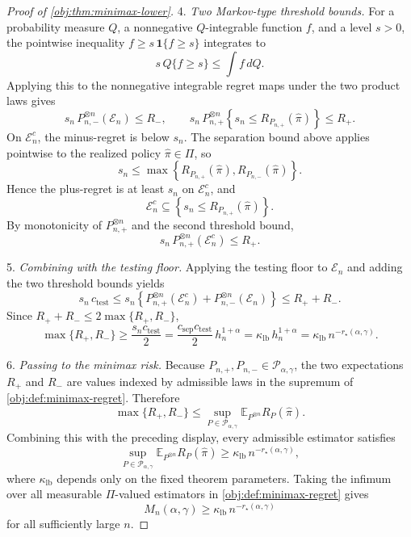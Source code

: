 \documentclass[11pt]{article}
\begin{document}
\begin{proof}[Proof of \cref{obj:thm:minimax-lower}]
4. \emph{Two Markov-type threshold bounds.}  For a probability measure \(Q\), a nonnegative \(Q\)-integrable function \(f\), and a level \(s>0\), the pointwise inequality \(f\ge s\,\mathbf 1\{f\ge s\}\) integrates to
\[
s\,Q\{f\ge s\}\le\int f\,dQ .
\]
Applying this to the nonnegative integrable regret maps under the two product laws gives
\[
s_n\,P_{n,-}^{\otimes n}(\mathcal E_n)\le R_-,
\qquad
s_n\,P_{n,+}^{\otimes n}\left\{s_n\le R_{P_{n,+}}(\widehat\pi)\right\}\le R_+ .
\]
On \(\mathcal E_n^c\), the minus-regret is below \(s_n\).  The separation bound above applies pointwise to the realized policy \(\widehat\pi\in\Pi\), so
\[
s_n\le
\max\left\{R_{P_{n,+}}(\widehat\pi),R_{P_{n,-}}(\widehat\pi)\right\}.
\]
Hence the plus-regret is at least \(s_n\) on \(\mathcal E_n^c\), and
\[
\mathcal E_n^c\subseteq \left\{s_n\le R_{P_{n,+}}(\widehat\pi)\right\}.
\]
By monotonicity of \(P_{n,+}^{\otimes n}\) and the second threshold bound,
\[
s_n\,P_{n,+}^{\otimes n}(\mathcal E_n^c)\le R_+ .
\]

5. \emph{Combining with the testing floor.}  Applying the testing floor to \(\mathcal E_n\) and adding the two threshold bounds yields
\[
s_n\,c_{\mathrm{test}}
\le
s_n\left\{P_{n,+}^{\otimes n}(\mathcal E_n^c)+P_{n,-}^{\otimes n}(\mathcal E_n)\right\}
\le
R_+ + R_- .
\]
Since \(R_++R_-\le 2\max\{R_+,R_-\}\),
\[
\max\{R_+,R_-\}
\ge
\frac{s_n c_{\mathrm{test}}}{2}
=
\frac{c_{\mathrm{sep}}c_{\mathrm{test}}}{2}\,h_n^{1+\alpha}
=
\kappa_{\mathrm{lb}}\,h_n^{1+\alpha}
=
\kappa_{\mathrm{lb}}\,n^{-r_\star(\alpha,\gamma)} .
\]

6. \emph{Passing to the minimax risk.}  Because \(P_{n,+},P_{n,-}\in\mathcal P_{\alpha,\gamma}\), the two expectations \(R_+\) and \(R_-\) are values indexed by admissible laws in the supremum of \cref{obj:def:minimax-regret}.  Therefore
\[
\max\{R_+,R_-\}
\le
\sup_{P\in\mathcal P_{\alpha,\gamma}}
\mathbb E_{P^{\otimes n}} R_P(\widehat\pi).
\]
Combining this with the preceding display, every admissible estimator satisfies
\[
\sup_{P\in\mathcal P_{\alpha,\gamma}}
\mathbb E_{P^{\otimes n}} R_P(\widehat\pi)
\ge
\kappa_{\mathrm{lb}}\,n^{-r_\star(\alpha,\gamma)},
\]
where \(\kappa_{\mathrm{lb}}\) depends only on the fixed theorem parameters.  Taking the infimum over all measurable \(\Pi\)-valued estimators in \cref{obj:def:minimax-regret} gives
\[
M_n(\alpha,\gamma)\ge \kappa_{\mathrm{lb}}\,n^{-r_\star(\alpha,\gamma)}
\]
for all sufficiently large \(n\). %
\end{proof}
\end{document}
